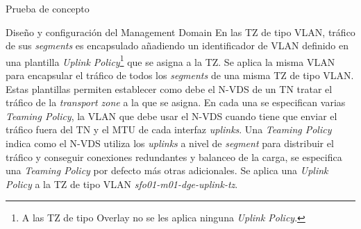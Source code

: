 \begin{section}{Prueba de concepto}
\begin{subsection}{Diseño y configuración del Management Domain}
    \FloatBarrier
    En las TZ de tipo VLAN, tráfico de sus \textit{segments} es encapsulado añadiendo un identificador de VLAN definido en una plantilla \textit{Uplink Policy}\footnote{A las TZ de tipo Overlay no se les aplica ninguna \textit{Uplink Policy}.} que se asigna a la TZ. Se aplica la misma VLAN para encapsular el tráfico de todos los \textit{segments} de una misma TZ de tipo VLAN. Estas plantillas permiten establecer como debe el N-VDS de un TN tratar el tráfico de la \textit{transport zone} a la que se asigna. En cada una se especifican varias \textit{Teaming Policy}, la VLAN que debe usar el N-VDS cuando tiene que enviar el tráfico fuera del TN y el MTU de cada interfaz \textit{uplinks}. Una \textit{Teaming Policy} indica como el N-VDS utiliza los \textit{uplinks} a nivel de \textit{segment} para distribuir el tráfico y conseguir conexiones redundantes y balanceo de la carga, se especifica una \textit{Teaming Policy} por defecto más otras adicionales. Se aplica una \textit{Uplink Policy} a la TZ de tipo VLAN  \textit{sfo01-m01-dge-uplink-tz}.
    \begin{figure}[h]
      \centering

\end{figure}
\end{subsection}
\end{section}
